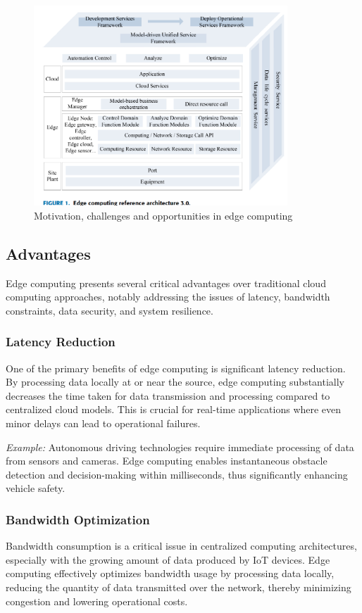 \documentclass[runningheads]{llncs}
\begin{document}
\begin{figure}[ht]
    \centering
    \includegraphics[width=0.85\textwidth]{IMG/6.png}
    \caption{Motivation, challenges and opportunities in edge computing}
    \label{fig:motivation_challenges_opportunities}
    \end{figure}

\subsection{Advantages}

Edge computing presents several critical advantages over traditional cloud computing approaches, notably addressing the issues of latency, bandwidth constraints, data security, and system resilience.

\subsubsection{Latency Reduction}
One of the primary benefits of edge computing is significant latency reduction. By processing data locally at or near the source, edge computing substantially decreases the time taken for data transmission and processing compared to centralized cloud models. This is crucial for real-time applications where even minor delays can lead to operational failures.

\textit{Example:} Autonomous driving technologies require immediate processing of data from sensors and cameras. Edge computing enables instantaneous obstacle detection and decision-making within milliseconds, thus significantly enhancing vehicle safety.

\subsubsection{Bandwidth Optimization}
Bandwidth consumption is a critical issue in centralized computing architectures, especially with the growing amount of data produced by IoT devices. Edge computing effectively optimizes bandwidth usage by processing data locally, reducing the quantity of data transmitted over the network, thereby minimizing congestion and lowering operational costs.
\end{document}
